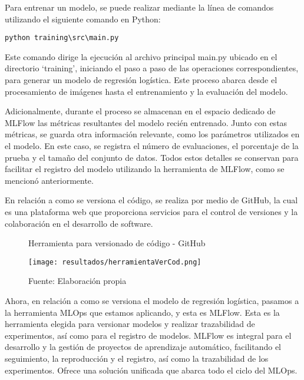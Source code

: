 \newpage

Para entrenar un modelo, se puede realizar mediante la línea de comandos utilizando el siguiente comando en Python: 
\begin{verbatim}
python training\src\main.py
\end{verbatim}

Este comando dirige la ejecución al archivo principal main.py ubicado en el directorio `training', iniciando el paso a paso de las operaciones correspondientes, para generar un modelo de regresión logística. Este proceso abarca desde el procesamiento de imágenes hasta el entrenamiento y la evaluación del modelo. \newline

Adicionalmente, durante el proceso se almacenan en el espacio dedicado de MLFlow las métricas resultantes del modelo recién entrenado. Junto con estas métricas, se guarda otra información relevante, como los parámetros utilizados en el modelo. En este caso, se registra el número de evaluaciones, el porcentaje de la prueba y el tamaño del conjunto de datos. Todos estos detalles se conservan para facilitar el registro del modelo utilizando la herramienta de MLFlow, como se mencionó anteriormente. \newline

En relación a como se versiona el código, se realiza por medio de GitHub, la cual es una plataforma web que proporciona servicios para el control de versiones y la colaboración en el desarrollo de software.

\newpage

\begin{figure}[h]
\centering
\caption{Herramienta para versionado de código - GitHub}
\texttt{[image: resultados/herramientaVerCod.png]}
\caption*{\footnotesize Fuente: Elaboración propia}
\label{fig:figuraHerramientaVerCod}
\end{figure}

Ahora, en relación a como se versiona el modelo de regresión logística, pasamos a la herramienta MLOps que estamos aplicando, y esta es MLFlow. Esta es la herramienta elegida para versionar modelos y realizar trazabilidad de experimentos, así como para el registro de modelos. MLFlow es integral para el desarrollo y la gestión de proyectos de aprendizaje automático, facilitando el seguimiento, la reproducción y el registro, así como la trazabilidad de los experimentos. Ofrece una solución unificada que abarca todo el ciclo del MLOps. \newline

